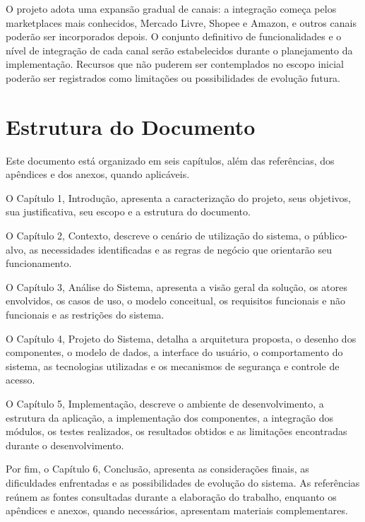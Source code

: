O projeto adota uma expansão gradual de canais: a integração começa pelos marketplaces mais conhecidos, Mercado Livre, Shopee e Amazon, e outros canais poderão ser incorporados depois. O conjunto definitivo de funcionalidades e o nível de integração de cada canal serão estabelecidos durante o planejamento da implementação. Recursos que não puderem ser contemplados no escopo inicial poderão ser registrados como limitações ou possibilidades de evolução futura.

\section{Estrutura do Documento}

Este documento está organizado em seis capítulos, além das referências, dos apêndices e dos anexos, quando aplicáveis.

O Capítulo 1, Introdução, apresenta a caracterização do projeto, seus objetivos, sua justificativa, seu escopo e a estrutura do documento.

O Capítulo 2, Contexto, descreve o cenário de utilização do sistema, o público-alvo, as necessidades identificadas e as regras de negócio que orientarão seu funcionamento.

O Capítulo 3, Análise do Sistema, apresenta a visão geral da solução, os atores envolvidos, os casos de uso, o modelo conceitual, os requisitos funcionais e não funcionais e as restrições do sistema.

O Capítulo 4, Projeto do Sistema, detalha a arquitetura proposta, o desenho dos componentes, o modelo de dados, a interface do usuário, o comportamento do sistema, as tecnologias utilizadas e os mecanismos de segurança e controle de acesso.

O Capítulo 5, Implementação, descreve o ambiente de desenvolvimento, a estrutura da aplicação, a implementação dos componentes, a integração dos módulos, os testes realizados, os resultados obtidos e as limitações encontradas durante o desenvolvimento.

Por fim, o Capítulo 6, Conclusão, apresenta as considerações finais, as dificuldades enfrentadas e as possibilidades de evolução do sistema. As referências reúnem as fontes consultadas durante a elaboração do trabalho, enquanto os apêndices e anexos, quando necessários, apresentam materiais complementares.